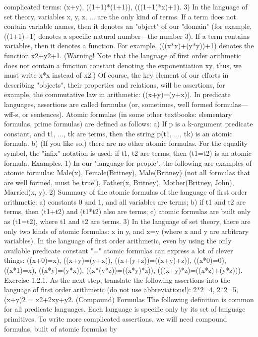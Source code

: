 complicated terms: (x+y), ((1+1)*(1+1)), (((1+1)*x)+1).
3) In the language of set theory, variables x, y, z, ... are the only kind of terms.
If a term does not contain variable names, then it denotes an "object" of our "domain" (for example,
((1+1)+1) denotes a specific natural number---the number 3). If a term contains variables, then it denotes
a function. For example, (((x*x)+(y*y))+1) denotes the function x2+y2+1. (Warning! Note that the
language of first order arithmetic does not contain a function constant denoting the exponentiation xy,
thus, we must write x*x instead of x2.)
Of course, the key element of our efforts in describing "objects", their properties and relations, will be
assertions, for example, the commutative law in arithmetic: ((x+y)=(y+x)). In predicate languages,
assertions are called formulas (or, sometimes, well formed formulas---wff-s, or sentences).
Atomic formulas (in some other textbooks: elementary formulas, prime formulas) are defined as follows:
a) If p is a k-argument predicate constant, and t1, ..., tk are terms, then the string p(t1, ..., tk) is an atomic
formula.
b) (If you like so,) there are no other atomic formulas.
For the equality symbol, the "infix" notation is used: if t1, t2 are terms, then (t1=t2) is an atomic formula.
Examples. 1) In our "language for people", the following are examples of atomic formulas: Male(x), Female(Britney),
Male(Britney) (not all formulas that are well formed, must be true!), Father(x, Britney), Mother(Britney, John), Married(x, y).
2) Summary of the atomic formulas of the language of first order arithmetic: a) constants 0 and 1, and all variables are terms;
b) if t1 and t2 are terms, then (t1+t2) and (t1*t2) also are terms; c) atomic formulas are built only as (t1=t2), where t1 and t2 are
terms.
3) In the language of set theory, there are only two kinds of atomic formulas: x in y, and x=y (where x and y are arbitrary
variables).
In the language of first order arithmetic, even by using the only available predicate constant "=" atomic
formulas can express a lot of clever things:
((x+0)=x), ((x+y)=(y+x)), ((x+(y+z))=((x+y)+z)),
((x*0)=0), ((x*1)=x), ((x*y)=(y*x)), ((x*(y*z))=((x*y)*z)),
(((x+y)*z)=((x*z)+(y*z))).
Exercise 1.2.1. As the next step, translate the following assertions into the language of first order
arithmetic (do not use abbreviations!): 2*2=4, 2*2=5, (x+y)2 = x2+2xy+y2.
(Compound) Formulas
The following definition is common for all predicate languages. Each language is specific only by its
set of language primitives.
To write more complicated assertions, we will need compound formulas, built of atomic formulas by
